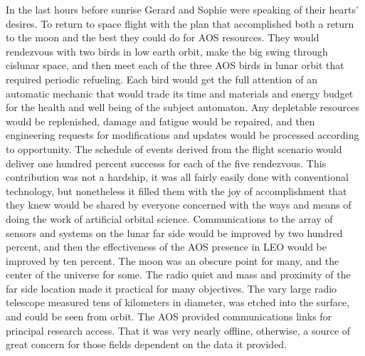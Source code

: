 

In the last hours before sunrise Gerard and Sophie were speaking of
their hearts' desires.  To return to space flight with the plan that
accomplished both a return to the moon and the best they could do for
AOS resources.  They would rendezvous with two birds in low earth
orbit, make the big swing through cislunar space, and then meet each
of the three AOS birds in lunar orbit that required periodic
refueling.  Each bird would get the full attention of an automatic
mechanic that would trade its time and materials and energy budget for
the health and well being of the subject automaton.  Any depletable
resources would be replenished, damage and fatigue would be repaired,
and then engineering requests for modifications and updates would be
processed according to opportunity.  The schedule of events derived
from the flight scenario would deliver one hundred percent successs
for each of the five rendezvous.  This contribution was not a
hardship, it was all fairly easily done with conventional technology,
but nonetheless it filled them with the joy of accomplishment that
they knew would be shared by everyone concerned with the ways and
means of doing the work of artificial orbital science.  Communications
to the array of sensors and systems on the lunar far side would be
improved by two hundred percent, and then the effectiveness of the AOS
presence in LEO would be improved by ten percent.  The moon was an
obscure point for many, and the center of the universe for some.  The
radio quiet and mass and proximity of the far side location made it
practical for many objectives.  The vary large radio telescope
measured tens of kilometers in diameter, was etched into the surface,
and could be seen from orbit.  The AOS provided communications links
for principal research access.  That it was very nearly offline,
otherwise, a source of great concern for those fields dependent on the
data it provided.

\bye
